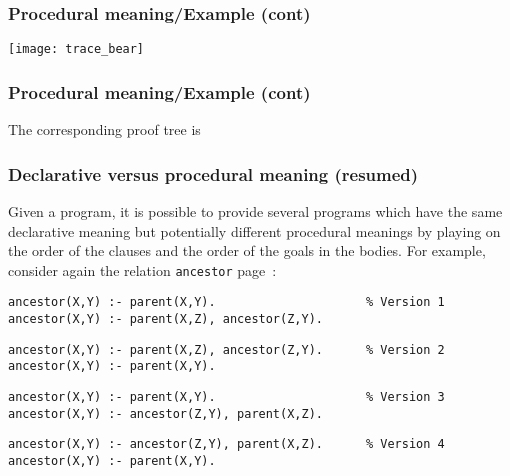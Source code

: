 %
\begin{frame}
\frametitle{Procedural meaning/Example (cont)}

\begin{center}
\texttt{[image: trace\_bear]}
\end{center}

\end{frame}

%
\begin{frame}
\frametitle{Procedural meaning/Example (cont)}

The corresponding proof tree is

\end{frame}

%
\begin{frame}[containsverbatim]
\frametitle{Declarative versus procedural meaning (resumed)}

Given a \Prolog program, it is possible to provide several
programs which have the same declarative meaning but potentially
different procedural meanings by playing on the order of the clauses
and the order of the goals in the bodies. For example, consider again
the relation \texttt{ancestor} page~\pageref{ancestor}:
{\small
\begin{verbatim}
ancestor(X,Y) :- parent(X,Y).                     % Version 1
ancestor(X,Y) :- parent(X,Z), ancestor(Z,Y).
\end{verbatim}
}
{\small
\begin{verbatim}
ancestor(X,Y) :- parent(X,Z), ancestor(Z,Y).      % Version 2
ancestor(X,Y) :- parent(X,Y).
\end{verbatim}
}
{\small
\begin{verbatim}
ancestor(X,Y) :- parent(X,Y).                     % Version 3
ancestor(X,Y) :- ancestor(Z,Y), parent(X,Z).
\end{verbatim}
}
{\small
\begin{verbatim}
ancestor(X,Y) :- ancestor(Z,Y), parent(X,Z).      % Version 4
ancestor(X,Y) :- parent(X,Y).
\end{verbatim}
}
\end{frame}

